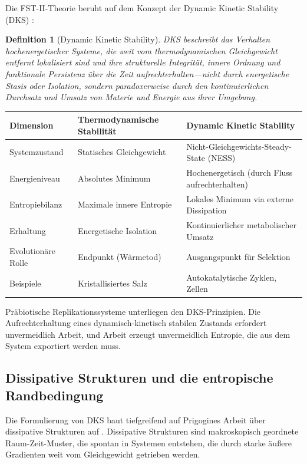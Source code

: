 \documentclass[12pt,a4paper]{article}
\newtheorem{definition}{Definition}
\theoremstyle{remark}
\begin{document}
Die FST-II-Theorie beruht auf dem Konzept der Dynamic Kinetic Stability (DKS) \citep{Pross2012}:

\begin{definition}[Dynamic Kinetic Stability]
DKS beschreibt das Verhalten hochenergetischer Systeme, die weit vom thermodynamischen Gleichgewicht entfernt lokalisiert sind und ihre strukturelle Integrit\"at, innere Ordnung und funktionale Persistenz \"uber die Zeit aufrechterhalten---nicht durch energetische Stasis oder Isolation, sondern paradoxerweise durch den kontinuierlichen Durchsatz und Umsatz von Materie und Energie aus ihrer Umgebung.
\end{definition}

\begin{center}
\begin{tabular}{lll}
\toprule
\textbf{Dimension} & \textbf{Thermodynamische Stabilit\"at} & \textbf{Dynamic Kinetic Stability} \\
\midrule
Systemzustand & Statisches Gleichgewicht & Nicht-Gleichgewichts-Steady-State (NESS) \\
Energieniveau & Absolutes Minimum & Hochenergetisch (durch Fluss aufrechterhalten) \\
Entropiebilanz & Maximale innere Entropie & Lokales Minimum via externe Dissipation \\
Erhaltung & Energetische Isolation & Kontinuierlicher metabolischer Umsatz \\
Evolution\"are Rolle & Endpunkt (W\"armetod) & Ausgangspunkt f\"ur Selektion \\
Beispiele & Kristallisiertes Salz & Autokatalytische Zyklen, Zellen \\
\bottomrule
\end{tabular}
\end{center}

Pr\"abiotische Replikationssysteme unterliegen den DKS-Prinzipien. Die Aufrechterhaltung eines dynamisch-kinetisch stabilen Zustands erfordert unvermeidlich Arbeit, und Arbeit erzeugt unvermeidlich Entropie, die aus dem System exportiert werden muss.

\subsection{Dissipative Strukturen und die entropische Randbedingung}

Die Formulierung von DKS baut tiefgreifend auf Prigogines Arbeit \"uber dissipative Strukturen auf \citep{Bioenergetics}. Dissipative Strukturen sind makroskopisch geordnete Raum-Zeit-Muster, die spontan in Systemen entstehen, die durch starke \"au\ss{}ere Gradienten weit vom Gleichgewicht getrieben werden.
\end{document}
